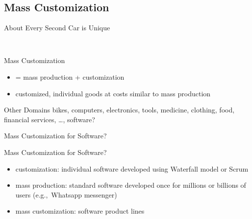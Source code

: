 \subsection{Mass Customization}
\begin{frame}{About Every Second Car is Unique}
	\centering{}
\end{frame}
\begin{frame}{\myframetitle\ }
	\begin{mycolumns}[widths={45}]
		\begin{definition}{Mass Customization}
			\begin{itemize}
			\item = mass production + customization
			\item customized, individual goods at costs similar to mass production
			\end{itemize}
		\end{definition}
	\mynextcolumn
		\begin{example}{Other Domains}
			bikes, computers, electronics, tools, medicine, clothing, food, financial services, \ldots, software?
		\end{example}
	\end{mycolumns}
\end{frame}

\begin{frame}{Mass Customization for Software?}
	\begin{mycolumns}[b,widths={55},animation=none]
		\begin{definition}{Mass Customization for Software?}
			\begin{itemize}
			\item customization: individual software developed using Waterfall model or Scrum
			\item mass production: standard software developed once for millions or billions of users (e.g.,~Whatsapp messenger)
			\item mass customization: software product lines
			\end{itemize}
		\end{definition}
	\mynextcolumn
	\end{mycolumns}
\end{frame}

